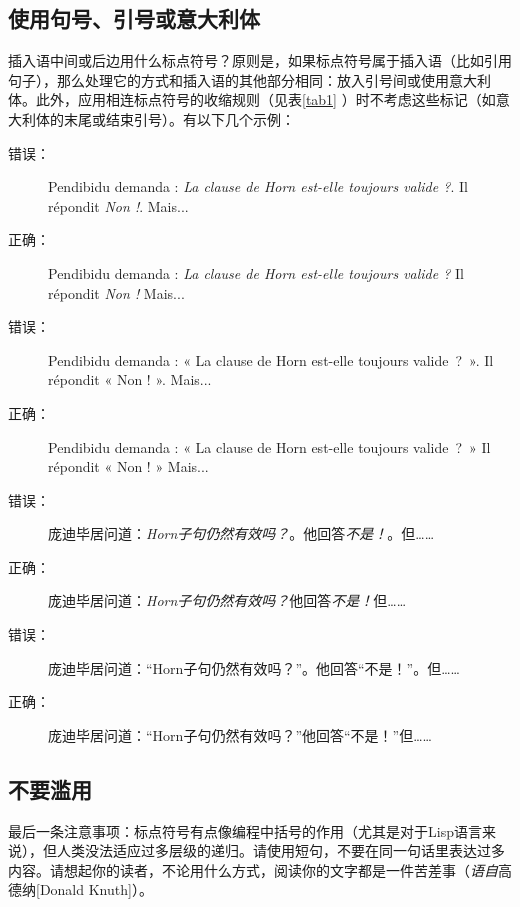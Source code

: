 \subsection{使用句号、引号或意大利体}

插入语中间或后边用什么标点符号？原则是，如果标点符号属于插入语（比如引用句子），那么处理它的方式和插入语的其他部分相同：放入引号间或使用意大利体。此外，应用相连标点符号的收缩规则（见表\ref{tab1}%
）时不考虑这些标记（如意大利体的末尾或结束引号）。有以下几个示例：

\begin{description}
    \item[错误：] Pendibidu demanda : \emph{La clause de Horn est-elle toujours valide ?}. Il répondit \emph{Non !}. Mais...
    \item[正确：] Pendibidu demanda : \emph{La clause de Horn est-elle toujours valide ?} Il répondit \emph{Non !} Mais...
    \item[错误：] Pendibidu demanda : « La clause de Horn est-elle toujours valide~?~». Il répondit « Non ! ». Mais...
    \item[正确：] Pendibidu demanda : « La clause de Horn est-elle toujours valide~?~» Il répondit « Non ! » Mais...
\end{description}

\begin{bil}
    \begin{description}
        \item[错误：]  庞迪毕居问道：\emph{Horn子句仍然有效吗？}。他回答\emph{不是！}。但……
        \item[正确：] 庞迪毕居问道：\emph{Horn子句仍然有效吗？}他回答\emph{不是！}但……
        \item[错误：] 庞迪毕居问道：``Horn子句仍然有效吗？''。他回答``不是！''。但……
        \item[正确：] 庞迪毕居问道：``Horn子句仍然有效吗？''他回答``不是！''但……
    \end{description}
\end{bil}

\subsection{不要滥用}

最后一条注意事项：标点符号有点像编程中括号的作用（尤其是对于Lisp语言来说），但人类没法适应过多层级的递归。请使用短句，不要在同一句话里表达过多内容。请想起你的读者，不论用什么方式，阅读你的文字都是一件苦差事（\emph{语自}高德纳[Donald Knuth]）。